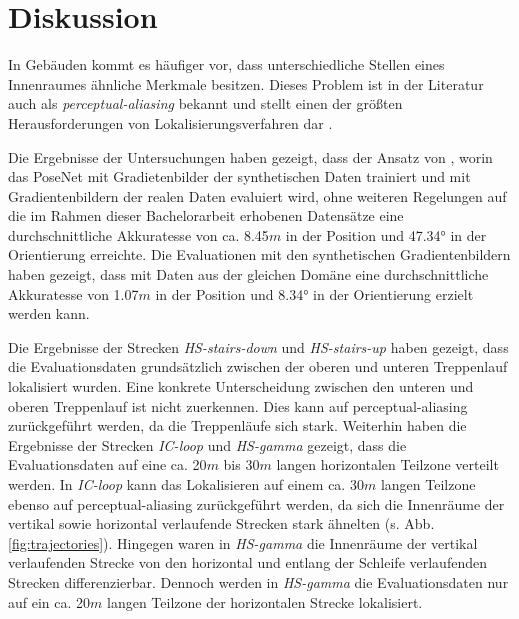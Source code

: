 
\section{Diskussion}
\label{sec:kapitel_5}

In Gebäuden kommt es häufiger vor, dass unterschiedliche Stellen eines Innenraumes ähnliche Merkmale besitzen. Dieses Problem ist in der Literatur auch als \textit{perceptual-aliasing} bekannt und stellt einen der größten Herausforderungen von Lokalisierungsverfahren dar \cite{lowryVisualPlaceRecognition2016}.

Die Ergebnisse der Untersuchungen haben gezeigt, dass der Ansatz von \citet{acharyaBIMPoseNetIndoorCamera2019}, worin das PoseNet mit Gradietenbilder der synthetischen Daten trainiert und mit Gradientenbildern der realen Daten evaluiert wird, ohne weiteren Regelungen auf die im Rahmen dieser Bachelorarbeit erhobenen Datensätze eine durchschnittliche Akkuratesse von ca. 8.45$m$ in der Position und 47.34° in der Orientierung erreichte. Die Evaluationen mit den synthetischen Gradientenbildern haben gezeigt, dass mit Daten aus der gleichen Domäne eine durchschnittliche Akkuratesse von 1.07$m$ in der Position und 8.34° in der Orientierung erzielt werden kann. 

Die Ergebnisse der Strecken \textit{HS-stairs-down} und \textit{HS-stairs-up} haben gezeigt, dass die Evaluationsdaten grundsätzlich zwischen der oberen und unteren Treppenlauf lokalisiert wurden. Eine konkrete Unterscheidung zwischen den unteren und oberen Treppenlauf ist nicht zuerkennen. Dies kann auf perceptual-aliasing zurückgeführt werden, da die Treppenläufe sich stark. Weiterhin haben die Ergebnisse der Strecken \textit{IC-loop} und \textit{HS-gamma} gezeigt, dass die Evaluationsdaten auf eine ca. 20$m$ bis 30$m$ langen horizontalen Teilzone verteilt werden. In \textit{IC-loop} kann das Lokalisieren auf einem ca. 30$m$ langen Teilzone ebenso auf perceptual-aliasing zurückgeführt werden, da sich die Innenräume der vertikal sowie horizontal verlaufende Strecken stark ähnelten (s. Abb. \ref{fig:trajectories}). Hingegen waren in \textit{HS-gamma} die Innenräume der vertikal verlaufenden Strecke von den horizontal und entlang der Schleife verlaufenden Strecken differenzierbar. Dennoch werden in \textit{HS-gamma} die Evaluationsdaten nur auf ein ca. 20$m$ langen Teilzone der horizontalen Strecke lokalisiert.


